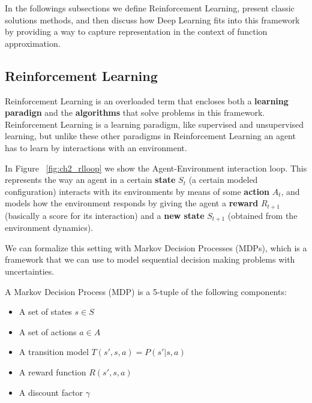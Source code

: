 \figdrlsamplesFirst

\figdrlsamplesSecond

\figdrlsamplesThird

In the followings subsections we define Reinforcement Learning, present classic solutions methods, and then
discuss how Deep Learning fits into this framework by providing a way to capture representation
in the context of function approximation.

\subsection{Reinforcement Learning}

Reinforcement Learning is an overloaded term that encloses both a \textbf{learning paradign}
and the \textbf{algorithms} that solve problems in this framework. Reinforcement Learning 
is a learning paradigm, like supervised and unsupervised learning, but unlike these other paradigms  
in Reinforcement Learning an agent has to learn by interactions with an environment.

In Figure ~\ref{fig:ch2_rlloop} we show the Agent-Environment interaction loop. This represents
the way an agent in a certain \textbf{state} $S_{t}$ (a certain modeled configuration) interacts 
with its environments by means of some \textbf{action} $A_{t}$, and models how the environment 
responds by giving the agent a \textbf{reward} $R_{t+1}$ (basically a score for its interaction) 
and a \textbf{new state} $S_{t+1}$ (obtained from the environment dynamics).

\figrlloop

We can formalize this setting with Markov Decision Processes (MDPs), which is a framework
that we can use to model sequential decision making problems with uncertainties.

\begin{definition}
    A Markov Decision Process (MDP) is a 5-tuple of the following components:
    \begin{itemize}
        \item A set of states $s \in S$
        \item A set of actions $a \in A$
        \item A transition model $T(s',s,a) = P(s'|s,a)$
        \item A reward function $R(s',s,a)$
        \item A discount factor $\gamma$
    \end{itemize}
\end{definition}

